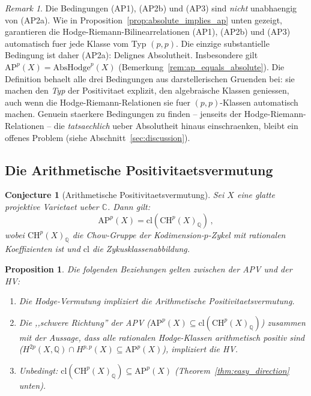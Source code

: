 \documentclass[aps,prd,twocolumn,superscriptaddress,nofootinbib]{revtex4-2}
\newtheorem{proposition}[theorem]{Proposition}
\newtheorem{conjecture}[theorem]{Conjecture}
\theoremstyle{definition}
\theoremstyle{remark}
\newtheorem{remark}[theorem]{Remark}
\begin{document}
\begin{remark}
\label{rem:redundancy}
Die Bedingungen (AP1), (AP2b) und (AP3) sind \textit{nicht} unabhaengig von (AP2a). Wie in Proposition~\ref{prop:absolute_implies_ap} unten gezeigt, garantieren die Hodge-Riemann-Bilinearrelationen (AP1), (AP2b) und (AP3) automatisch fuer jede Klasse vom Typ $(p,p)$. Die einzige substantielle Bedingung ist daher (AP2a): Delignes Absolutheit. Insbesondere gilt $\mathrm{AP}^p(X) = \mathrm{AbsHodge}^p(X)$ (Bemerkung~\ref{rem:ap_equals_absolute}). Die Definition behaelt alle drei Bedingungen aus darstellerischen Gruenden bei: sie machen den \textit{Typ} der Positivitaet explizit, den algebraische Klassen geniessen, auch wenn die Hodge-Riemann-Relationen sie fuer $(p,p)$-Klassen automatisch machen. Genuein staerkere Bedingungen zu finden -- jenseits der Hodge-Riemann-Relationen -- die \textit{tatsaechlich} ueber Absolutheit hinaus einschraenken, bleibt ein offenes Problem (siehe Abschnitt~\ref{sec:discussion}).
\end{remark}

\subsection{Die Arithmetische Positivitaetsvermutung}

\begin{conjecture}[Arithmetische Positivitaetsvermutung]
\label{conj:AP}
Sei $X$ eine glatte projektive Varietaet ueber $\mathbb{C}$. Dann gilt:
\begin{equation}
\mathrm{AP}^p(X) = \mathrm{cl}\!\left(\mathrm{CH}^p(X)_\mathbb{Q}\right)\,,
\end{equation}
wobei $\mathrm{CH}^p(X)_\mathbb{Q}$ die Chow-Gruppe der Kodimension-$p$-Zykel mit rationalen Koeffizienten ist und $\mathrm{cl}$ die Zykusklassenabbildung.
\end{conjecture}

\begin{proposition}
\label{prop:equivalence}
Die folgenden Beziehungen gelten zwischen der APV und der HV:
\begin{enumerate}
\item Die Hodge-Vermutung impliziert die Arithmetische Positivitaetsvermutung.
\item Die ,,schwere Richtung'' der APV ($\mathrm{AP}^p(X) \subseteq \mathrm{cl}(\mathrm{CH}^p(X)_\mathbb{Q})$) zusammen mit der Aussage, dass alle rationalen Hodge-Klassen arithmetisch positiv sind ($H^{2p}(X, \mathbb{Q}) \cap H^{p,p}(X) \subseteq \mathrm{AP}^p(X)$), impliziert die HV.
\item Unbedingt: $\mathrm{cl}(\mathrm{CH}^p(X)_\mathbb{Q}) \subseteq \mathrm{AP}^p(X)$ (Theorem~\ref{thm:easy_direction} unten).
\end{enumerate}
\end{proposition}
\end{document}
